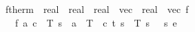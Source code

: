 \documentclass[envcountsame,envcountsect]{llncs}
\newcommand{\IF}[3]{\mathbf{if}\ #1\ \mathbf{then}\ #2\ \mathbf{else}\ #3}
\begin{document}
\begin{example}
\begin{isabellebody}
\isanewline
{}\isamarkupfalse%
\ ftherm\ {\isacharcolon}{\isacharcolon}\ {\isachardoublequoteopen}real\ {\isasymRightarrow}\ real\ {\isasymRightarrow}\ {\isacharparenleft}real{\isacharcomma}\ {}{\isacharparenright}\ vec\ {\isasymRightarrow}\ {\isacharparenleft}real{\isacharcomma}\ {}{\isacharparenright}\ vec{\isachardoublequoteclose}\ {\isacharparenleft}{\isachardoublequoteopen}f{\isachardoublequoteclose}{\isacharparenright}\isanewline
\ \ \ {\isachardoublequoteopen}f\ a\ c\ {\isasymequiv}\ {\isasymlbrakk}{\isacharbrackleft}T\ {\isasymmapsto}\isactrlsub s\ {\isacharminus}\ a\ {\isacharasterisk}\ {\isacharparenleft}T\ {\isacharminus}\ c{\isacharparenright}{\isacharcomma}\ t\ {\isasymmapsto}\isactrlsub s\ {}{\isacharcomma}\ T\ {\isasymmapsto}\isactrlsub s\ {}{\isacharcomma}\ {\isasymTheta}\ {\isasymmapsto}\isactrlsub s\ {}{\isacharbrackright}{\isasymrbrakk}\isactrlsub e{\isachardoublequoteclose}\isanewline
\end{isabellebody}

\end{example}
\end{document}

